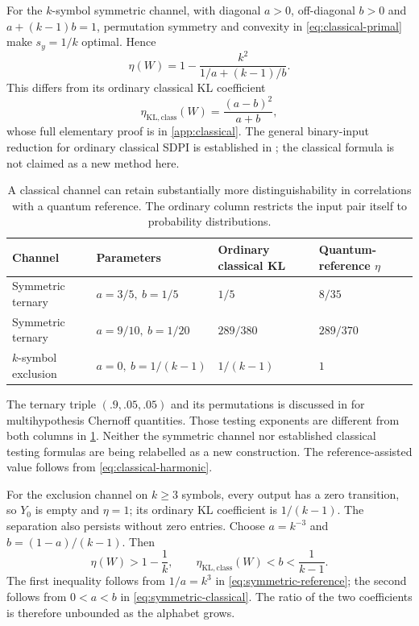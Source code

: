 \documentclass[11pt]{article}
\numberwithin{equation}{section}
\theoremstyle{definition}
\theoremstyle{remark}
\begin{document}
For the $k$-symbol symmetric channel, with diagonal $a>0$, off-diagonal
$b>0$ and $a+(k-1)b=1$, permutation symmetry and convexity in
\eqref{eq:classical-primal} make $s_y=1/k$ optimal. Hence
\begin{equation}
 \eta(W)=1-\frac{k^2}{1/a+(k-1)/b}.
 \label{eq:symmetric-reference}
\end{equation}
This differs from its ordinary classical KL coefficient
\begin{equation}
 \eta_{\mathrm{KL,class}}(W)=\frac{(a-b)^2}{a+b},
 \label{eq:symmetric-classical}
\end{equation}
whose full elementary proof is in \cref{app:classical}.
The general binary-input reduction for ordinary classical SDPI is
established in \cite[Theorem~1]{OP21}; the classical formula is not
claimed as a new method here.

\begin{table}[htbp]
\centering
\begin{tabular}{@{}llll@{}}
\toprule
Channel & Parameters & Ordinary classical KL & Quantum-reference $\eta$\\
\midrule
Symmetric ternary & $a=3/5,\ b=1/5$ & $1/5$ & $8/35$\\
Symmetric ternary & $a=9/10,\ b=1/20$ & $289/380$ & $289/370$\\
$k$-symbol exclusion & $a=0,\ b=1/(k-1)$ & $1/(k-1)$ & $1$\\
\bottomrule
\end{tabular}
\caption{A classical channel can retain substantially more distinguishability
in correlations with a quantum reference. The ordinary column restricts the
input pair itself to probability distributions.}
\label{tab:classical}
\end{table}

The ternary triple $(.9,.05,.05)$ and its permutations is discussed in
\cite[Section~9.4]{Balsu26} for multihypothesis Chernoff quantities.
Those testing exponents are different from both columns in
\cref{tab:classical}. Neither the symmetric channel nor established
classical testing formulas are being relabelled as a new construction.
The reference-assisted value follows from \eqref{eq:classical-harmonic}.

For the exclusion channel on $k\geq3$ symbols, every output has a zero
transition, so $Y_0$ is empty and $\eta=1$; its ordinary KL coefficient
is $1/(k-1)$. The separation also persists without zero entries.
Choose $a=k^{-3}$ and $b=(1-a)/(k-1)$. Then
\[
 \eta(W)>1-\frac1k,\qquad
 \eta_{\mathrm{KL,class}}(W)<b<\frac1{k-1}.
\]
The first inequality follows from $1/a=k^3$ in
\eqref{eq:symmetric-reference}; the second follows from $0<a<b$ in
\eqref{eq:symmetric-classical}. The ratio of the two coefficients is
therefore unbounded as the alphabet grows.
\end{document}
